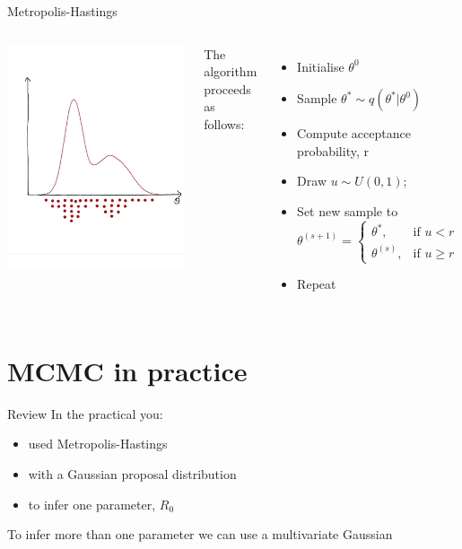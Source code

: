 \documentclass[compress]{beamer}
\begin{document}
\begin{frame}[label=sec-7-12]{Metropolis-Hastings}
\begin{columns}[c] 
\includegraphics[width=0.8\linewidth]{MH6}

The algorithm proceeds as follows:\\
\begin{itemize}
\item Initialise $\theta^{0}$
\item Sample $\theta^* \sim q(\theta^*|\theta^{0})$
\item Compute acceptance probability, r
\item Draw $u \sim U(0,1)$;
\item Set new sample to 
\[
 \theta^{(s+1)} = 
\begin{cases}
    \theta^*, & \text{if } u < r\\
    \theta^{(s)}, & \text{if } u \geqslant r
\end{cases}
\]
\item Repeat
\end{itemize}
\end{columns}
\end{frame}

\section{MCMC in practice}
\label{sec-8}
\begin{frame}[label=sec-8-1]{Review}
In the practical you:
\begin{itemize}
\item used Metropolis-Hastings
\item with a Gaussian proposal distribution
\item to infer one parameter, $R_0$
\end{itemize} 
To infer more than one parameter we can use a multivariate Gaussian
\end{frame}
\end{document}
